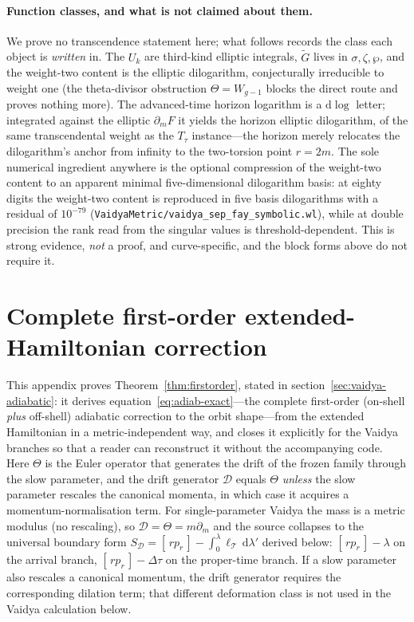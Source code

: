 \documentclass[12pt]{iopart}
\newcommand{\dd}{\mathrm{d}}
\theoremstyle{plain}
\theoremstyle{definition}
\theoremstyle{plain}
\theoremstyle{remark}
\begin{document}
\paragraph{Function classes, and what is not claimed about them.}
We prove no transcendence statement here; what follows records the class each
object is \emph{written} in. The $U_k$ are third-kind elliptic integrals, $\tilde G$
lives in $\sigma,\zeta,\wp$, and the weight-two content is the elliptic dilogarithm,
conjecturally irreducible to weight one (the theta-divisor obstruction
$\Theta=W_{g-1}$ blocks the direct route and proves nothing more). The
advanced-time horizon logarithm is a $\dd\log$ letter; integrated
against the elliptic $\partial_m F$ it yields the horizon elliptic dilogarithm, of the
same transcendental weight as the $T_\tau$ instance---the horizon merely relocates the
dilogarithm's anchor from infinity to the two-torsion point $r=2m$. The sole
numerical ingredient anywhere is the optional compression of the weight-two content to
an apparent minimal five-dimensional dilogarithm basis: at eighty digits the
weight-two content is reproduced in five basis dilogarithms with a residual of
$10^{-79}$ (\texttt{VaidyaMetric/vaidya\_sep\_fay\_symbolic.wl}), while at double
precision the rank read from the singular values is threshold-dependent. This is
strong evidence, \emph{not} a proof, and curve-specific, and the block forms above do
not require it.

\FloatBarrier


\section{Complete first-order extended-Hamiltonian correction}
\label{app:firstorder}

This appendix proves Theorem~\ref{thm:firstorder}, stated in section~\ref{sec:vaidya-adiabatic}: it derives
equation~\eqref{eq:adiab-exact}---the complete first-order (on-shell \emph{plus} off-shell)
adiabatic correction to the orbit shape---from the extended Hamiltonian in a
metric-independent way, and closes it explicitly for the Vaidya branches so that a reader
can reconstruct it without the accompanying code. Here $\Theta$ is the Euler operator that
generates the drift of the frozen family through the slow parameter, and the drift
generator $\mathcal D$ equals $\Theta$ \emph{unless} the slow parameter rescales the
canonical momenta, in which case it acquires a momentum-normalisation term. For
single-parameter Vaidya the mass is a metric modulus (no rescaling), so
$\mathcal D=\Theta=m\partial_m$ and the source collapses to the universal boundary form
$S_{\mathcal D}=[\,rp_r\,]-\int_0^\lambda\ell_{\mathcal T}\,\dd\lambda'$ derived below:
$[\,rp_r\,]-\lambda$ on the arrival branch, $[\,rp_r\,]-\Delta\tau$ on the proper-time branch. If a slow parameter also rescales a
canonical momentum, the drift generator requires the corresponding dilation term; that
different deformation class is not used in the Vaidya calculation below.
\end{document}
